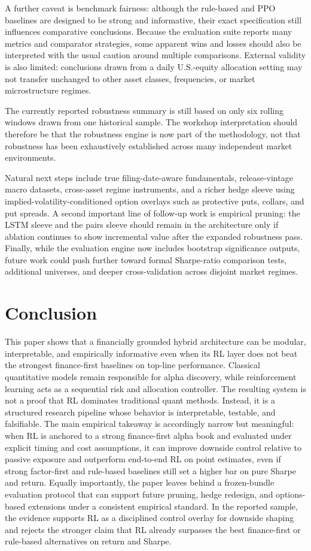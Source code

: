 \documentclass[10pt,twocolumn]{article}
\begin{document}
A further caveat is benchmark fairness: although the rule-based and PPO
baselines are designed to be strong and informative, their exact specification
still influences comparative conclusions.
Because the evaluation suite reports many metrics and comparator strategies,
some apparent wins and losses should also be interpreted with the usual caution
around multiple comparisons.
External validity is also limited: conclusions drawn from a daily U.S.-equity
allocation setting may not transfer unchanged to other asset classes,
frequencies, or market microstructure regimes.

The currently reported robustness summary is still based on only six rolling
windows drawn from one historical sample. The workshop interpretation should
therefore be that the robustness engine is now part of the methodology, not
that robustness has been exhaustively established across many independent market
environments.

Natural next steps include true filing-date-aware fundamentals, release-vintage
macro datasets, cross-asset regime instruments, and a richer hedge sleeve using
implied-volatility-conditioned option overlays such as protective puts, collars,
and put spreads. A second important line of follow-up work is empirical pruning:
the LSTM sleeve and the pairs sleeve should remain in the architecture only if
ablation continues to show incremental value after the expanded robustness pass.
Finally, while the evaluation engine now includes bootstrap significance
outputs, future work could push further toward formal Sharpe-ratio comparison
tests, additional universes, and deeper cross-validation across disjoint market
regimes.

\section{Conclusion}

This paper shows that a financially grounded hybrid architecture can be modular,
interpretable, and empirically informative even when its RL layer does not beat
the strongest finance-first baselines on top-line performance. Classical quantitative models remain
responsible for alpha discovery, while reinforcement learning acts as a
sequential risk and allocation controller. The resulting system is not a proof
that RL dominates traditional quant methods. Instead, it is a structured
research pipeline whose behavior is interpretable, testable, and falsifiable.
The main empirical takeaway is accordingly narrow but meaningful: when RL is
anchored to a strong finance-first alpha book and evaluated under explicit
timing and cost assumptions, it can improve downside control relative to passive
exposure and outperform end-to-end RL on point estimates, even if strong
factor-first and rule-based baselines still set a higher bar on pure Sharpe and
return. Equally importantly, the paper leaves behind a frozen-bundle evaluation
protocol that can support future pruning, hedge redesign, and options-based
extensions under a consistent empirical standard. In the reported sample, the
evidence supports RL as a disciplined control overlay for downside shaping and
rejects the stronger claim that RL already surpasses the best finance-first or
rule-based alternatives on return and Sharpe.
\end{document}
